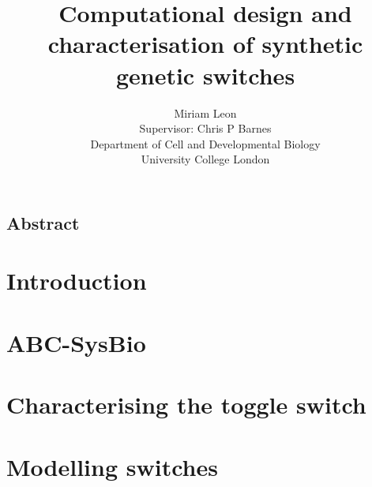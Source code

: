 \documentclass[]{phdthesis}
\begin{document}
\title{Computational design and\\characterisation of synthetic\\ genetic switches}
\author{Miriam Leon \\ Supervisor: Chris P Barnes\\ Department of Cell and Developmental
 Biology \\ University College London}
\date{}
\maketitle

\newpage
\section{Abstract}
\setcounter{secnumdepth}{4}
\setcounter{tocdepth}{4}
\tableofcontents* 
\newpage
\listoffigures
\newpage
\listoftables
\pagestyle{plain}


\mainmatter*
\chapter{Introduction}


\mainmatter*
\chapter{ABC-SysBio}


\mainmatter*
\chapter{Characterising the toggle switch}



\mainmatter*
\chapter{Modelling switches}






\end{document}
